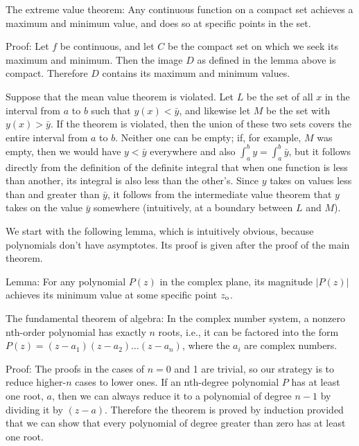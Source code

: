 The extreme value theorem: Any continuous function on a compact set achieves a maximum and minimum value,
and does so at specific points in the set.

Proof: Let $f$ be continuous, and let $C$ be the compact set on which we seek its maximum and minimum.
Then the image $D$ as defined in the lemma above is compact. Therefore $D$ contains its maximum and
minimum values.


Suppose that the mean value theorem is violated. Let $L$ be the set of all $x$ in the interval from $a$ to $b$
such that $y(x)<\bar{y}$, and likewise let $M$ be the set with $y(x)>\bar{y}$. If the theorem is violated, then
the union of these two sets covers the entire interval from $a$ to $b$. Neither one can be empty; if, for example, $M$ was
empty, then we would have $y<\bar{y}$ everywhere and also $\int_a^b y=\int_a^b\bar{y}$, but it follows directly from
the definition of the definite integral that when one function is less than another, its integral is also less
than the other's. Since $y$ takes on values less than and greater than $\bar{y}$, it follows from the intermediate value theorem
that $y$ takes on the value $\bar{y}$ somewhere (intuitively, at a boundary between $L$ and $M$).

\clearpage


We start with the following lemma, which is intuitively obvious, because polynomials don't have asymptotes.
Its proof is given after the proof of the main theorem.

Lemma: For any polynomial $P(z)$ in the complex plane, its magnitude $|P(z)|$ achieves its minimum
value at some specific point $z_{\textup{o}}$.

The fundamental theorem of algebra: In the complex number system, a nonzero nth-order polynomial has exactly $n$
roots, i.e., it can be factored into the form $P(z)=(z-a_1)(z-a_2)\ldots(z-a_n)$,
where the $a_i$ are complex numbers.

Proof: The proofs in the cases of $n=0$ and 1 are trivial, so our strategy is to
reduce higher-$n$ cases to lower ones. If an nth-degree polynomial $P$ has at least
one root, $a$, then we can always reduce it to a polynomial of degree $n-1$ by
dividing it by $(z-a)$. Therefore the theorem is proved by induction provided that
we can show that every polynomial of degree greater than zero has at least one
root.

